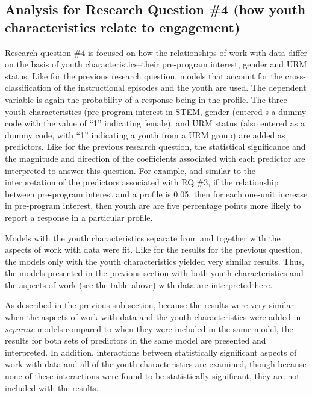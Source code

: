 \documentclass[]{book}
\theoremstyle{definition}
\theoremstyle{definition}
\theoremstyle{definition}
\theoremstyle{remark}
\begin{document}
\subsection{Analysis for Research Question \#4 (how youth
characteristics relate to
engagement)}\label{analysis-for-research-question-4-how-youth-characteristics-relate-to-engagement}

Research question \#4 is focused on how the relationships of work with
data differ on the basis of youth characteristics--their pre-program
interest, gender and URM status. Like for the previous research
question, models that account for the cross-classification of the
instructional episodes and the youth are used. The dependent variable is
again the probability of a response being in the profile. The three
youth characteristics (pre-program interest in STEM, gender (entered s a
dummy code with the value of ``1'' indicating female), and URM status
(also entered as a dummy code, with ``1'' indicating a youth from a URM
group) are added as predictors. Like for the previous research question,
the statistical significance and the magnitude and direction of the
coefficients associated with each predictor are interpreted to answer
this question. For example, and similar to the interpretation of the
predictors associated with RQ \#3, if the relationship between
pre-program interest and a profile is 0.05, then for each one-unit
increase in pre-program interest, then youth are are five percentage
points more likely to report a response in a particular profile.

Models with the youth characteristics separate from and together with
the aspects of work with data were fit. Like for the results for the
previous question, the models only with the youth characteristics
yielded very similar results. Thus, the models presented in the previous
section with both youth characteristics and the aspects of work (see the
table above) with data are interpreted here.

As described in the previous sub-section, because the results were very
similar when the aspects of work with data and the youth characteristics
were added in \emph{separate} models compared to when they were included
in the same model, the results for both sets of predictors in the same
model are presented and interpreted. In addition, interactions between
statistically significant aspects of work with data and all of the youth
characteristics are examined, though because none of these interactions
were found to be statistically significant, they are not included with
the results.
\end{document}
